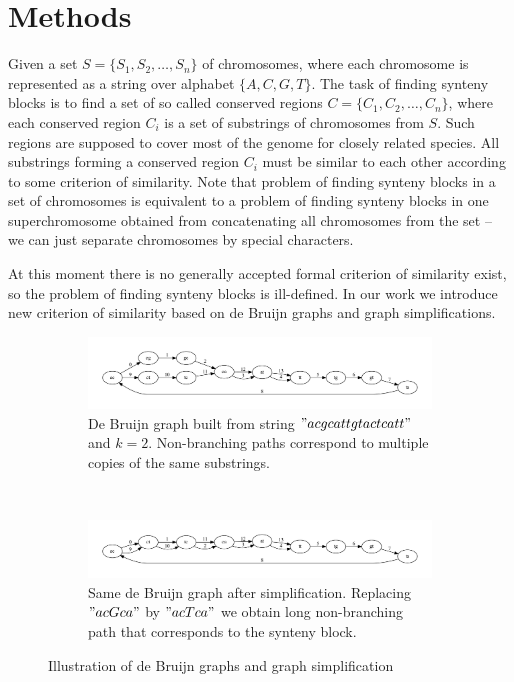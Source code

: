 \documentclass[a4paper, 12pt]{scrartcl}
\begin{document}
\section{Methods}

Given a set \(S = \lbrace S_{1}, S_{2}, \ldots, S_{n} \rbrace \) of chromosomes, where each
chromosome is represented as a string over alphabet \(\lbrace A, C, G, T \rbrace \). The task of finding synteny
blocks is to find a set of so called conserved regions \(C = \lbrace C_{1}, C_{2}, \ldots , C_{n} \rbrace \), where
each conserved region \(C_{i}\) is a set of substrings of chromosomes from \(S\). Such regions are supposed 
to cover most of the genome for closely related species.  All substrings forming a conserved region \(C_{i}\) must be
similar to each other according to some criterion of similarity. Note that problem of finding synteny blocks in a set
of chromosomes is equivalent to a problem of finding synteny blocks in one superchromosome
obtained from concatenating all chromosomes from the set -- we can just separate chromosomes by special characters.

At this moment there is no generally accepted formal criterion of similarity exist, so the problem of finding synteny blocks is ill-defined.
In our work we introduce new criterion of similarity based on de Bruijn graphs and graph simplifications.

\begin{figure}
        \begin{subfigure}[a]{1\textwidth}
		\includegraphics[scale = 0.50]{graph1.pdf}
		\small \caption{De Bruijn graph built from string \("acgcattgtactcatt"\) and \(k = 2\). Non-branching paths correspond to multiple
			copies of the same substrings.}
		\label{DeBruijnA}
        \end{subfigure}
	\\
        \begin{subfigure}[b]{1\textwidth}
		\includegraphics[scale = 0.50]{graph2.pdf}
		\small \caption{Same de Bruijn graph after simplification. Replacing \("acGca"\) by \("acTca"\) we obtain long non-branching path
			that corresponds to the synteny block.}
		\label{DeBruijnB}
        \end{subfigure}
	\small \caption{Illustration of de Bruijn graphs and graph simplification}
\end{figure}
\end{document}
